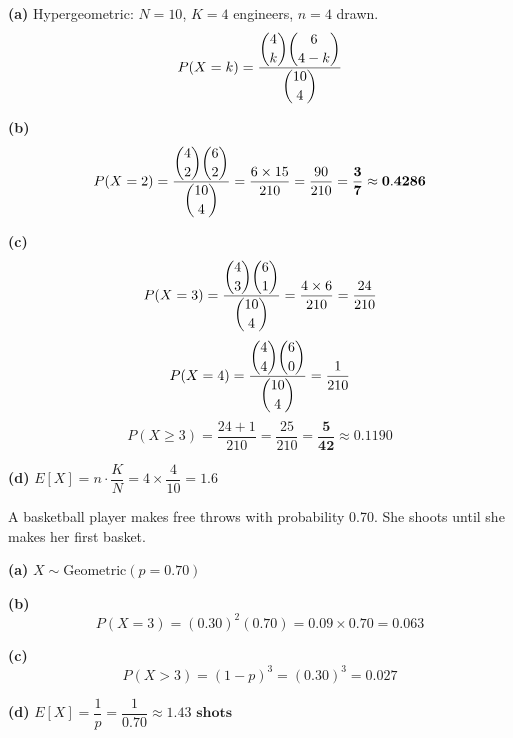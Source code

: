 \documentclass[addpoints]{exam}
\begin{document}
\begin{questions}
\begin{solution}[9cm]
\textbf{(a)} Hypergeometric: $N=10$, $K=4$ engineers, $n=4$ drawn.
\[
P(X=k) = \frac{\dbinom{4}{k}\dbinom{6}{4-k}}{\dbinom{10}{4}}
\]

\textbf{(b)}
\[
P(X=2) = \frac{\dbinom{4}{2}\dbinom{6}{2}}{\dbinom{10}{4}}
= \frac{6 \times 15}{210} = \frac{90}{210} = \mathbf{\frac{3}{7} \approx 0.4286}
\]

\textbf{(c)}
\[
P(X=3) = \frac{\dbinom{4}{3}\dbinom{6}{1}}{\dbinom{10}{4}} = \frac{4 \times 6}{210} = \frac{24}{210}
\]
\[
P(X=4) = \frac{\dbinom{4}{4}\dbinom{6}{0}}{\dbinom{10}{4}} = \frac{1}{210}
\]
\[
P(X \geq 3) = \frac{24+1}{210} = \frac{25}{210} = \mathbf{\frac{5}{42} \approx 0.1190}
\]

\textbf{(d)} $E[X] = n \cdot \dfrac{K}{N} = 4 \times \dfrac{4}{10} = \mathbf{1.6}$
\end{solution}

\question A basketball player makes free throws with probability 0.70. She shoots until
she makes her first basket.
\begin{solution}[8cm]
\textbf{(a)} $X \sim \text{Geometric}(p = 0.70)$

\textbf{(b)}
\[
P(X=3) = (0.30)^2(0.70) = 0.09 \times 0.70 = \mathbf{0.063}
\]

\textbf{(c)}
\[
P(X > 3) = (1-p)^3 = (0.30)^3 = \mathbf{0.027}
\]

\textbf{(d)} $E[X] = \dfrac{1}{p} = \dfrac{1}{0.70} \approx \mathbf{1.43 \text{ shots}}$
\end{solution}

\end{questions}
\end{document}
